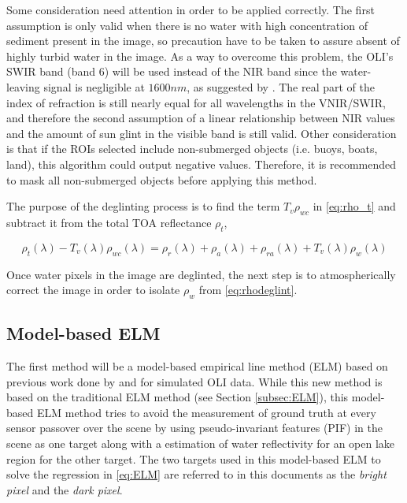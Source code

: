 
Some consideration need attention in order to be applied correctly. The first assumption is only valid when there is no water with high concentration of sediment present in the image, so precaution have to be taken to assure absent of highly turbid water in the image. As a way to overcome this problem, the OLI's SWIR band (band 6) will be used instead of the NIR band since the water-leaving signal is negligible at $1600nm$, as suggested by \cite{GeraceThesis}. The real part of the index of refraction is still nearly equal for all wavelengths in the VNIR/SWIR, and therefore the second assumption of a linear relationship between NIR values and the amount of sun glint in the visible band is still valid. Other consideration is that if the ROIs selected include non-submerged objects (i.e. buoys, boats, land), this algorithm could output negative values. Therefore, it is recommended to mask all non-submerged objects before applying this method.


The purpose of the deglinting process is to find the term $T_v\rho_{wc}$ in \autoref{eq:rho_t} and subtract it from the total TOA reflectance $\rho_t$,

\begin{equation}\label{eq:rhodeglint}
  \rho_t(\lambda)-T_v(\lambda)\rho_{wc}(\lambda) = \rho_r(\lambda)+\rho_a(\lambda)+\rho_{ra}(\lambda)+T_v(\lambda)\rho_{w}(\lambda)
\end{equation}

Once water pixels in the image are deglinted, the next step is to atmospherically correct the image in order to isolate $\rho_w$ from \autoref{eq:rhodeglint}.



\subsection{Model-based ELM}
The first method will be a model-based empirical line method (ELM) based on previous work done by \cite{Gerace:2013} and \cite{Gerace:2012}  for simulated OLI data. While this new method is based on the traditional ELM method (see Section \ref{subsec:ELM}), this model-based ELM method tries to avoid the measurement of ground truth at every sensor passover over the scene by using pseudo-invariant features (PIF)  in the scene as one target along with a estimation of water reflectivity for an open lake region for the other target. The two targets used in this model-based ELM to solve the regression in \autoref{eq:ELM} are referred to in this documents as the {\it bright pixel}  and the {\it dark pixel}.

